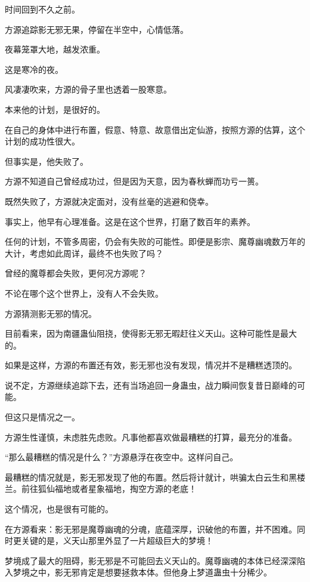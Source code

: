 
\begin{this_body}

时间回到不久之前。

方源追踪影无邪无果，停留在半空中，心情低落。

夜幕笼罩大地，越发浓重。

这是寒冷的夜。

风凄凄吹来，方源的骨子里也透着一股寒意。

本来他的计划，是很好的。

在自己的身体中进行布置，假意、特意、故意借出定仙游，按照方源的估算，这个计划的成功性很大。

但事实是，他失败了。

方源不知道自己曾经成功过，但是因为天意，因为春秋蝉而功亏一篑。

既然失败了，方源就决定面对，没有丝毫的逃避和侥幸。

事实上，他早有心理准备。这是在这个世界，打磨了数百年的素养。

任何的计划，不管多周密，仍会有失败的可能性。即便是影宗、魔尊幽魂数万年的大计，考虑如此周详，最终不也失败了吗？

曾经的魔尊都会失败，更何况方源呢？

不论在哪个这个世界上，没有人不会失败。

方源猜测影无邪的情况。

目前看来，因为南疆蛊仙阻挠，使得影无邪无暇赶往义天山。这种可能性是最大的。

如果是这样，方源的布置还有效，影无邪也没有发现，情况并不是糟糕透顶的。

说不定，方源继续追踪下去，还有当场追回一身蛊虫，战力瞬间恢复昔日巅峰的可能。

但这只是情况之一。

方源生性谨慎，未虑胜先虑败。凡事他都喜欢做最糟糕的打算，最充分的准备。

“那么最糟糕的情况是什么？”方源悬浮在夜空中。这样问自己。

最糟糕的情况就是，影无邪发现了他的布置。然后将计就计，哄骗太白云生和黑楼兰。前往狐仙福地或者星象福地，掏空方源的老底！

这个情况，也是很有可能的。

在方源看来：影无邪是魔尊幽魂的分魂，底蕴深厚，识破他的布置，并不困难。同时更关键的是，义天山那里外显了一片超级巨大的梦境！

梦境成了最大的阻碍，影无邪是不可能回去义天山的。魔尊幽魂的本体已经深深陷入梦境之中，影无邪肯定是想要拯救本体。但他身上梦道蛊虫十分稀少。


\end{this_body}
